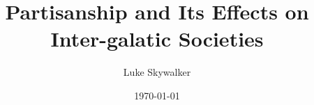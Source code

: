 

\title{Partisanship and Its Effects on Inter-galatic Societies}
\author{Luke Skywalker}
\date{\today}

\doublespacing

  
  
  \afterpage{\null\addtocounter{page}{-1}\newpage}
  
  {\hypersetup{linkcolor=black}
    \setcounter{secnumdepth}{4}
    
    \setcounter{tocdepth}{3}
    
    \tableofcontents
    \listoffigures
  }

  \setlength{\parindent}{1em}
  \setlength{\parskip}{0em}

  \newpage
  
  
  
  \printbibliography


